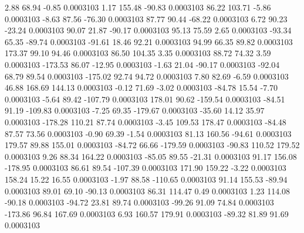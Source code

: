         2.88       68.94       -0.85     0.0003103
        1.17      155.48      -90.83     0.0003103
       86.22      103.71       -5.86     0.0003103
       -8.63       87.56      -76.30     0.0003103
       87.77       90.44      -68.22     0.0003103
        6.72       90.23      -23.24     0.0003103
       90.07       21.87      -90.17     0.0003103
       95.13       75.59        2.65     0.0003103
      -93.34       65.35      -89.74     0.0003103
      -91.61       18.46       92.21     0.0003103
       94.99       66.35       89.82     0.0003103
      173.37       99.10       94.46     0.0003103
       86.50      104.35        3.35     0.0003103
       88.72       74.32        3.59     0.0003103
     -173.53       86.07      -12.95     0.0003103
       -1.63       21.04      -90.17     0.0003103
      -92.04       68.79       89.54     0.0003103
     -175.02       92.74       94.72     0.0003103
        7.80       82.69       -6.59     0.0003103
       46.88      168.69      144.13     0.0003103
       -0.12       71.69       -3.02     0.0003103
      -84.78       15.54       -7.70     0.0003103
       -5.64       89.42     -107.79     0.0003103
      178.01       90.62     -159.54     0.0003103
      -84.51       91.19     -109.83     0.0003103
       -7.25       69.35     -179.67     0.0003103
      -35.60       14.12       35.97     0.0003103
     -178.28      110.21       87.74     0.0003103
       -3.45      109.53      178.47     0.0003103
      -84.48       87.57       73.56     0.0003103
       -0.90       69.39       -1.54     0.0003103
       81.13      160.56      -94.61     0.0003103
      179.57       89.88      155.01     0.0003103
      -84.72       66.66     -179.59     0.0003103
      -90.83      110.52      179.52     0.0003103
        9.26       88.34      164.22     0.0003103
      -85.05       89.55      -21.31     0.0003103
       91.17      156.08     -178.95     0.0003103
       86.61       89.54     -107.39     0.0003103
      171.90      159.22       -3.22     0.0003103
      158.24       15.22       16.55     0.0003103
       -1.97       88.58     -110.65     0.0003103
       91.14      155.53      -89.94     0.0003103
       89.01       69.10      -90.13     0.0003103
       86.31      114.47        0.49     0.0003103
        1.23      114.08      -90.18     0.0003103
      -94.72       23.81       89.74     0.0003103
      -99.26       91.09       74.84     0.0003103
     -173.86       96.84      167.69     0.0003103
        6.93      160.57      179.91     0.0003103
      -89.32       81.89       91.69     0.0003103
